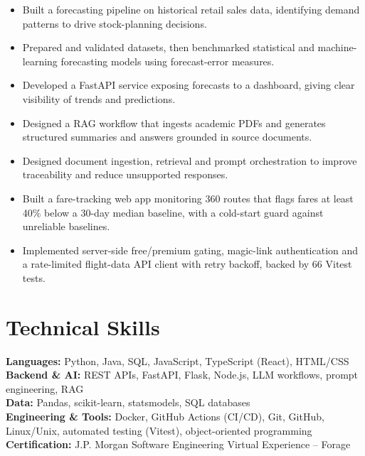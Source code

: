 \begin{itemize}
  \item Built a forecasting pipeline on historical retail sales data, identifying demand patterns to drive
        stock-planning decisions.
  \item Prepared and validated datasets, then benchmarked statistical and machine-learning forecasting models
        using forecast-error measures.
  \item Developed a FastAPI service exposing forecasts to a dashboard, giving clear visibility of trends and predictions.
\end{itemize}

\begin{itemize}
  \item Designed a RAG workflow that ingests academic PDFs and generates structured summaries and answers grounded
        in source documents.
  \item Designed document ingestion, retrieval and prompt orchestration to improve traceability and reduce
        unsupported responses.
\end{itemize}

\begin{itemize}
  \item Built a fare-tracking web app monitoring 360 routes that flags fares at least 40\% below a 30-day median
        baseline, with a cold-start guard against unreliable baselines.
  \item Implemented server-side free/premium gating, magic-link authentication and a rate-limited flight-data API
        client with retry backoff, backed by 66 Vitest tests.
\end{itemize}

\section{Technical Skills}
\textbf{Languages:} Python, Java, SQL, JavaScript, TypeScript (React), HTML/CSS\\
\textbf{Backend \& AI:} REST APIs, FastAPI, Flask, Node.js, LLM workflows, prompt engineering, RAG\\
\textbf{Data:} Pandas, scikit-learn, statsmodels, SQL databases\\
\textbf{Engineering \& Tools:} Docker, GitHub Actions (CI/CD), Git, GitHub, Linux/Unix, automated testing (Vitest), object-oriented programming\\
\textbf{Certification:} J.P. Morgan Software Engineering Virtual Experience -- Forage

